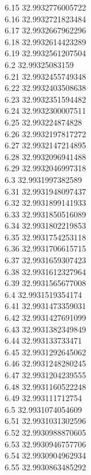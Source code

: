 {6.15	32.9932776005722\\
6.16	32.9932721823484\\
6.17	32.9932667962296\\
6.18	32.9932614423289\\
6.19	32.9932561207504\\
6.2	32.99325083159\\
6.21	32.9932455749348\\
6.22	32.9932403508638\\
6.23	32.9932351594482\\
6.24	32.9932300007511\\
6.25	32.993224874828\\
6.26	32.9932197817272\\
6.27	32.9932147214895\\
6.28	32.9932096941488\\
6.29	32.9932046997318\\
6.3	32.9931997382589\\
6.31	32.9931948097437\\
6.32	32.9931899141933\\
6.33	32.9931850516089\\
6.34	32.9931802219853\\
6.35	32.9931754253118\\
6.36	32.9931706615715\\
6.37	32.9931659307423\\
6.38	32.9931612327964\\
6.39	32.9931565677008\\
6.4	32.9931519354174\\
6.41	32.9931473359031\\
6.42	32.9931427691099\\
6.43	32.9931382349849\\
6.44	32.993133733471\\
6.45	32.9931292645062\\
6.46	32.9931248280245\\
6.47	32.9931204239555\\
6.48	32.9931160522248\\
6.49	32.993111712754\\
6.5	32.9931074054609\\
6.51	32.9931031302596\\
6.52	32.9930988870605\\
6.53	32.9930946757706\\
6.54	32.9930904962934\\
6.55	32.9930863485292\\
}
